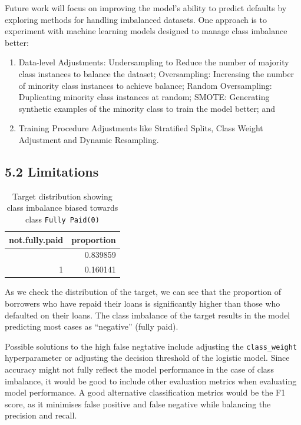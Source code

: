 \documentclass[
  letterpaper,
  DIV=11,
  numbers=noendperiod]{scrartcl}
\begin{document}
Future work will focus on improving the model's ability to predict
defaults by exploring methods for handling imbalanced datasets. One
approach is to experiment with machine learning models designed to
manage class imbalance better:

\begin{enumerate}
\def\labelenumi{(\arabic{enumi})}
\item
  Data-level Adjustments: Undersampling to Reduce the number of majority
  class instances to balance the dataset; Oversampling: Increasing the
  number of minority class instances to achieve balance; Random
  Oversampling: Duplicating minority class instances at random; SMOTE:
  Generating synthetic examples of the minority class to train the model
  better; and
\item
  Training Procedure Adjustments like Stratified Splits, Class Weight
  Adjustment and Dynamic Resampling.
\end{enumerate}

\subsection{5.2 Limitations}\label{limitations}

\begin{longtable}[]{@{}rr@{}}

\caption{\label{tbl-target_dist}Target distribution showing class
imbalance biased towards class \texttt{Fully\ Paid(0)}}

\tabularnewline

\toprule\noalign{}
not.fully.paid & proportion \\
\midrule\noalign{}
\endhead
\bottomrule\noalign{}
\endlastfoot
0 & 0.839859 \\
1 & 0.160141 \\

\end{longtable}

As we check the distribution of the target, we can see that the
proportion of borrowers who have repaid their loans is significantly
higher than those who defaulted on their loans. The class imbalance of
the target results in the model predicting most cases as ``negative''
(fully paid).

Possible solutions to the high false negtative include adjusting the
\texttt{class\_weight} hyperparameter or adjusting the decision
threshold of the logistic model. Since accuracy might not fully reflect
the model performance in the case of class imbalance, it would be good
to include other evaluation metrics when evaluating model performance. A
good alternative classification metrics would be the F1 score, as it
minimises false positive and false negative while balancing the
precision and recall.
\end{document}

